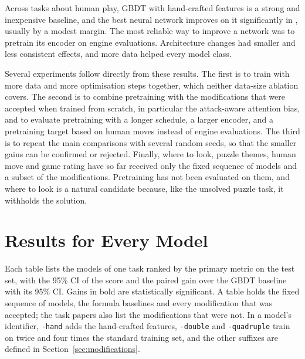 \documentclass[11pt]{article}
\begin{document}
Across  tasks about human play, GBDT with hand-crafted
features is a strong and inexpensive baseline, and the best neural network
improves on it significantly in , usually by a
modest margin. The most reliable way to improve a network was to pretrain
its encoder on engine evaluations. Architecture changes had smaller and
less consistent effects, and more data helped every model class.

Several experiments follow directly from these results. The first is to
train with more data and more optimisation steps together, which neither
data-size ablation covers. The second is to combine pretraining with the
modifications that were accepted when trained from scratch, in particular
the attack-aware attention bias, and to evaluate pretraining with a longer
schedule, a larger encoder, and a pretraining target based on human moves
instead of engine evaluations. The third is to repeat the main comparisons
with several random seeds, so that the smaller gains can be confirmed or
rejected. Finally, where to look, puzzle themes, human move and game rating
have so far received only the fixed sequence of models and a subset of the
modifications. Pretraining has not been evaluated on them, and where to look
is a natural candidate because, like the unsolved puzzle task, it withholds
the solution.




\appendix

\section{Results for Every Model}
\label{sec:runs}

Each table lists the models of one task ranked by the primary metric on the
test set, with the 95\% CI of the score and the paired gain over the GBDT
baseline with its 95\% CI. Gains in bold are statistically significant. A
table holds the fixed sequence of models, the formula baselines and every
modification that was accepted; the task papers also list the modifications
that were not. In a model's identifier, \texttt{-hand} adds the hand-crafted
features, \texttt{-double} and \texttt{-quadruple} train on twice and four
times the standard training set, and the other suffixes are defined in
Section~\ref{sec:modifications}.

\begin{table}[htbp]\centering\small
{}
\caption{Puzzle difficulty.}
\end{table}
\end{document}
